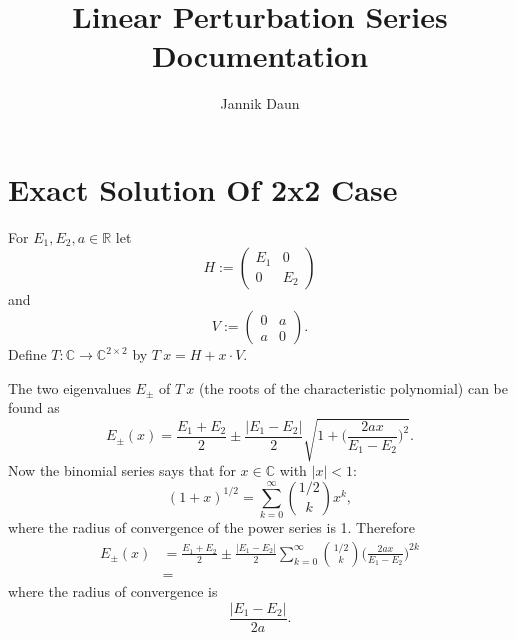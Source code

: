 \documentclass[11pt]{article}
\title{Linear Perturbation Series Documentation}
\author{Jannik Daun}
\begin{document}
\maketitle
\tableofcontents

\section{Exact Solution Of 2x2 Case}

For $E_1, E_2, a \in \mathbb{R}$
let
$$H:=
\begin{pmatrix}
E_1 & 0 \\
0 & E_2
\end{pmatrix}$$
and
$$
V :=
\begin{pmatrix}
0 & a \\
a & 0
\end{pmatrix}.
$$
Define $T: \mathbb{C} \to \mathbb{C}^{2 \times 2}$
by $T \ x =  H + x \cdot V$.

The two eigenvalues $E_\pm$ of $T \  x$ (the roots of the characteristic polynomial) can be found as
\begin{equation}
   E_\pm (x) =  \frac{E_{1}+ E_2}{2}
   \pm \frac{|E_1 -E_2|}{2} \sqrt{
    1 + \bigg(\frac{2 a x}{E_1-E_2}\bigg)^2
   }.
\end{equation}
Now the binomial series says that for $x \in \mathbb{C}$ with $|x|<1$:
\begin{equation}
    (1+x)^{1/2} = \sum_{k=0}^\infty
    {1/2 \choose k} x^k,
\end{equation}
where the radius of convergence of the power series is 1.
Therefore
\begin{equation}
    \begin{split}
        E_\pm (x) &=  \frac{E_{1}+ E_2}{2}
   \pm \frac{|E_1 -E_2|}{2} \sum_{k=0}^\infty
   {1/2 \choose k} \bigg(\frac{2 a x}{E_1-E_2}\bigg)^{2k} \\
   &= 
    \end{split}
\end{equation}
where the radius of convergence is
\begin{equation}
    \frac{|E_1 -E_2|}{2a} .
\end{equation}
\end{document}
